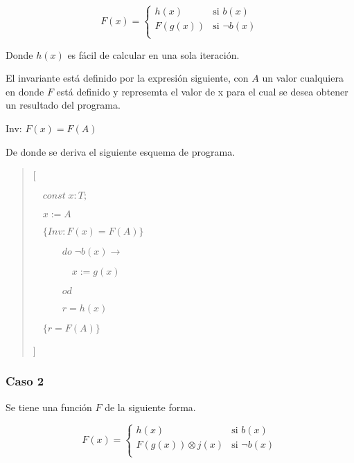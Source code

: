 \documentclass[hidelinks]{article}
\newenvironment{absolutelynopagebreak}
{\Needspace{10\baselineskip}\begin{quote}}
		{\end{quote}}
\begin{document}
\begin{equation}
	F(x) =
	\begin{cases}
		h(x)    & \text{si } b(x)      \\
		F(g(x)) & \text{si } \neg b(x) \\
	\end{cases}
\end{equation} \par

Donde $h(x)$ es fácil de calcular en una sola iteración.\par

El invariante está definido por la expresión siguiente, con $A$ un valor
cualquiera en donde $F$ está definido y represemta el valor de x para el cual
se desea obtener un resultado del programa.\par

\begin{center}
	Inv: $F(x) = F(A)$
\end{center}

De donde se deriva el siguiente esquema de programa.\par

\begin{absolutelynopagebreak}
	[\par
		$\quad const \; x: T;$\par
		$\quad x := A$\par
		$\quad \{Inv: F(x) = F(A)\}$\par
		$\qquad \quad do \; \neg b(x) \rightarrow$ \par
		$\qquad \qquad x := g(x)$ \par
		$\qquad \quad od$ \par
		$\qquad \quad r = h(x)$ \par
		$\quad \{r =F(A)\}$ \par
	]\par
\end{absolutelynopagebreak}\par

\subsubsection{Caso 2}

Se tiene una función $F$ de la siguiente forma.\par

\begin{equation}
	F(x) =
	\begin{cases}
		h(x)                 & \text{si } b(x)      \\
		F(g(x)) \otimes j(x) & \text{si } \neg b(x) \\
	\end{cases}
\end{equation} \par
\end{document}
